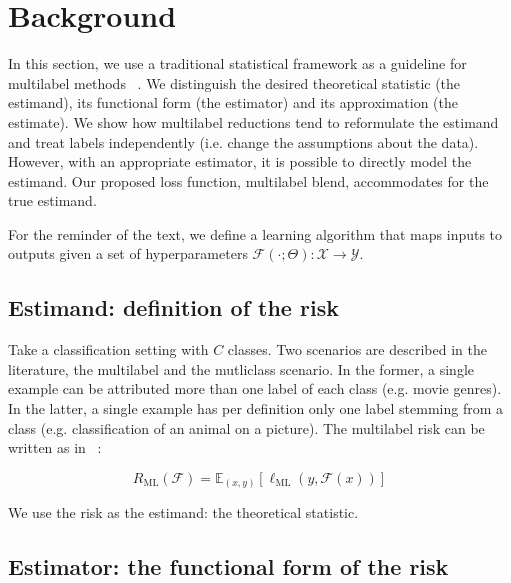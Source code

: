 
\section{Background}
\label{section:background}

In this section, we use a traditional statistical framework as a guideline for multilabel methods~\citep{tukey} . We distinguish the desired theoretical statistic (the estimand), its functional form (the estimator) and its approximation (the estimate). We show how multilabel reductions tend to reformulate the estimand and treat labels independently (i.e. change the assumptions about the data). However, with an appropriate estimator, it is possible to directly model the estimand. Our proposed loss function, multilabel blend, accommodates for the true estimand.

For the reminder of the text, we define a learning algorithm that maps inputs to outputs given a set of hyperparameters \(\mathcal{F}(\cdot ; \Theta): \mathcal{X} \rightarrow \mathcal{Y}\). 

\subsection{Estimand: definition of the risk}
\label{section:background:estimand}

Take a classification setting with $C$ classes. Two scenarios are described in the literature, the multilabel and the mutliclass scenario. In the former, a single example can be attributed more than one label of each class (e.g. movie genres). In the latter, a single example has per definition only one label stemming from a class (e.g. classification of an animal on a picture). The multilabel risk can be written as in ~\citep{multilabelReduction}:

\begin{equation}
R_{\mathrm{ML}}(\mathcal{F}) = \mathbb{E}_{(x, y)}\left[\ell_{\mathrm{ML}}(y, \mathcal{F}(x))\right]
\end{equation}

We use the risk as the estimand: the theoretical statistic. 

\subsection{Estimator: the functional form of the risk}
\label{section:background:estimator}

